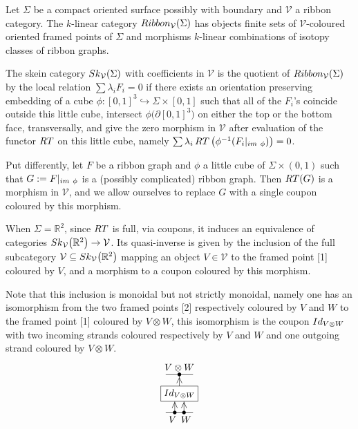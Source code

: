 \documentclass[11pt]{article}
\numberwithin{equation}{section}
\numberwithin{equation}{section}
\begin{document}
\begin{Definition}
Let $\Sigma$ be a compact oriented surface possibly with boundary and $\mathcal{V}$ a ribbon category. The $k$-linear category ${\rm Ribbon}_\mathcal{V}(\Sigma)$ has objects finite sets of $\mathcal{V}$-coloured oriented framed points of $\Sigma$ and morphisms $k$-linear combinations of isotopy classes of ribbon graphs.

The skein category ${\rm Sk}_\mathcal{V}(\Sigma)$ with coefficients in $\mathcal{V}$ is the quotient of ${\rm Ribbon}_\mathcal{V}(\Sigma)$ by the local relation $\sum \lambda_i F_i = 0$ if there exists an orientation preserving embedding of a cube $\phi\colon [0,1]^3 \hookrightarrow \Sigma \times [0,1]$ such that all of the $F_i$'s coincide outside this little cube, intersect $\phi\big(\partial [0,1]^3\big)$ on either the top or the bottom face, transversally, and give the zero morphism in $\mathcal{V}$ after evaluation of the functor ${\rm RT}$ on this little cube, namely $\sum \lambda_i \mathop{\rm RT}\big(\phi^{-1}(F_i\vert_{{\rm im}\ \phi})\big) = 0$.

Put differently, let $F$ be a ribbon graph and $\phi$ a little cube of $\Sigma \times (0,1)$ such that $G := F\vert_{{\rm im}\ \phi}$ is a (possibly complicated) ribbon graph. Then $\mathop{\rm RT}(G)$ is a morphism in $\mathcal{V}$, and we allow ourselves to replace $G$ with a single coupon coloured by this morphism.
\end{Definition}

\begin{Remark}\label{rmkInclVtoSkMonoid}
When $\Sigma = \mathbb{R}^2$, since ${\rm RT}$ is full, via coupons, it induces an equivalence of categories ${\rm Sk}_\mathcal{V}\big(\mathbb{R}^2\big)\to \mathcal{V}$. Its quasi-inverse is given by the inclusion of the full subcategory $\mathcal{V} \subseteq {\rm Sk}_\mathcal{V}\big(\mathbb{R}^2\big)$ mapping an object $V \in \mathcal{V}$ to the framed point [1] coloured by $V$, and a morphism to a coupon coloured by this morphism.

Note that this inclusion is monoidal but not strictly monoidal, namely one has an isomorphism from the two framed points [2] respectively coloured by $V$ and $W$ to the framed point [1] coloured by $V \otimes W$, this isomorphism is the coupon ${\rm Id}_{V \otimes W}$ with two incoming strands coloured respectively by $V$ and $W$ and one outgoing strand coloured by $V \otimes W$.
$$
\begin{tikzpicture}[yscale = 0.7, baseline = 0pt]
\draw (0,0) -- (1,0) node[pos = 0.25,below]{\small $V$} node[pos = 0.33]{\small $\bullet$} node[pos = 0.67]{\small $\bullet$} node[pos = 0.75,below]{\small $W$};
\draw (0,2) -- (1,2) node[pos = 0.5]{\small $\bullet$} node[midway,above]{\small $V \otimes W$};
\draw (0.33,0) -- ++(0,1) node[pos = 0.4, sloped]{\footnotesize $>$};
\draw (0.67,0) -- ++(0,1) node[pos = 0.4, sloped]{\footnotesize $>$};
\draw (0.5,1) -- ++(0,1) node[pos = 0.7, sloped]{\footnotesize $>$};
\node[draw, rectangle, fill=white] at (0.5,1) {\small ${\rm Id}_{V \otimes W}$};
\end{tikzpicture}
$$
\end{Remark}
\end{document}
